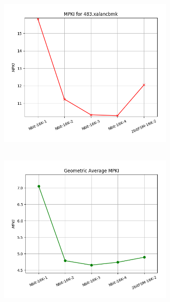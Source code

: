    \begin{minipage}{\textwidth}
      \begin{center}
         \\
         \vspace{3mm}
         \includegraphics[width=0.65\textwidth, frame]{./graphs/4-2i/483-xalancbmk.png}
         \vspace{6mm}
      \end{center}
   \end{minipage}

   \begin{minipage}{\textwidth}
      \begin{center}
         \\
         \vspace{3mm}
         \includegraphics[width=0.65\textwidth, frame]{./graphs/4-2i/mean.png}
         \vspace{6mm}
      \end{center}
   \end{minipage}
\vspace{3em}
